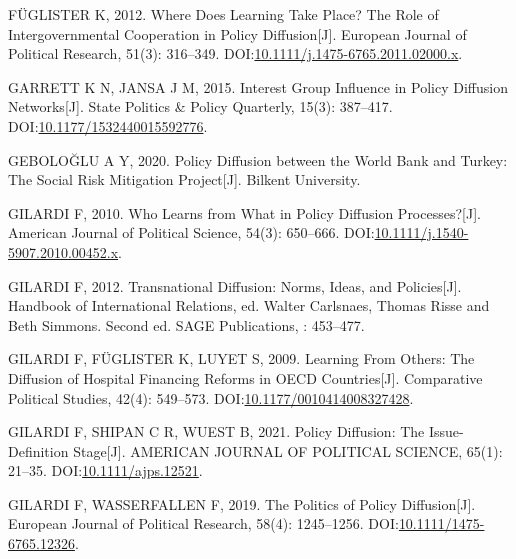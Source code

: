\documentclass[
  12pt,
]{ctexart}
\newlength{\cslhangindent}
\newlength{\cslentryspacingunit} %
\newenvironment{CSLReferences}[2] %
 {%
  \setlength{\parindent}{0pt}
  \ifodd #1
  \let\oldpar\par
  \def\par{\hangindent=\cslhangindent\oldpar}
  \fi
  \setlength{\parskip}{#2\cslentryspacingunit}
 }%
 {}
\begin{document}
\begin{CSLReferences}{1}{0}
\leavevmode{}%
FÜGLISTER K, 2012. Where Does Learning Take Place? {The} Role of Intergovernmental Cooperation in Policy Diffusion{[}J{]}. European Journal of Political Research, 51(3): 316--349. DOI:\href{https://doi.org/10.1111/j.1475-6765.2011.02000.x}{10.1111/j.1475-6765.2011.02000.x}.

\leavevmode{}%
GARRETT K N, JANSA J M, 2015. Interest {Group Influence} in {Policy Diffusion Networks}{[}J{]}. State Politics \& Policy Quarterly, 15(3): 387--417. DOI:\href{https://doi.org/10.1177/1532440015592776}{10.1177/1532440015592776}.

\leavevmode{}%
GEBOLOĞLU A Y, 2020. Policy Diffusion between the {World Bank} and {Turkey}: The Social Risk Mitigation Project{[}J{]}. {Bilkent University}.

\leavevmode{}%
GILARDI F, 2010. Who {Learns} from {What} in {Policy Diffusion Processes}?{[}J{]}. American Journal of Political Science, 54(3): 650--666. DOI:\href{https://doi.org/10.1111/j.1540-5907.2010.00452.x}{10.1111/j.1540-5907.2010.00452.x}.

\leavevmode{}%
GILARDI F, 2012. Transnational Diffusion: {Norms}, Ideas, and Policies{[}J{]}. Handbook of International Relations, ed. Walter Carlsnaes, Thomas Risse and Beth Simmons. Second ed. SAGE Publications, : 453--477.

\leavevmode{}%
GILARDI F, FÜGLISTER K, LUYET S, 2009. Learning {From Others}: {The Diffusion} of {Hospital Financing Reforms} in {OECD Countries}{[}J{]}. Comparative Political Studies, 42(4): 549--573. DOI:\href{https://doi.org/10.1177/0010414008327428}{10.1177/0010414008327428}.

\leavevmode{}%
GILARDI F, SHIPAN C R, WUEST B, 2021. Policy {Diffusion}: {The Issue-Definition Stage}{[}J{]}. AMERICAN JOURNAL OF POLITICAL SCIENCE, 65(1): 21--35. DOI:\href{https://doi.org/10.1111/ajps.12521}{10.1111/ajps.12521}.

\leavevmode{}%
GILARDI F, WASSERFALLEN F, 2019. The Politics of Policy Diffusion{[}J{]}. European Journal of Political Research, 58(4): 1245--1256. DOI:\href{https://doi.org/10.1111/1475-6765.12326}{10.1111/1475-6765.12326}.


\end{CSLReferences}
\end{document}
